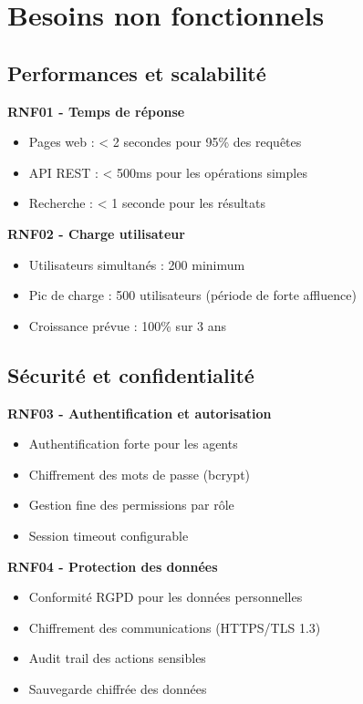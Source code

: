 \section{Besoins non fonctionnels}

\subsection{Performances et scalabilité}

\textbf{RNF01 - Temps de réponse}
\begin{itemize}
\item Pages web : < 2 secondes pour 95\% des requêtes
\item API REST : < 500ms pour les opérations simples
\item Recherche : < 1 seconde pour les résultats
\end{itemize}

\textbf{RNF02 - Charge utilisateur}
\begin{itemize}
\item Utilisateurs simultanés : 200 minimum
\item Pic de charge : 500 utilisateurs (période de forte affluence)
\item Croissance prévue : 100\% sur 3 ans
\end{itemize}

\subsection{Sécurité et confidentialité}

\textbf{RNF03 - Authentification et autorisation}
\begin{itemize}
\item Authentification forte pour les agents
\item Chiffrement des mots de passe (bcrypt)
\item Gestion fine des permissions par rôle
\item Session timeout configurable
\end{itemize}

\textbf{RNF04 - Protection des données}
\begin{itemize}
\item Conformité RGPD pour les données personnelles
\item Chiffrement des communications (HTTPS/TLS 1.3)
\item Audit trail des actions sensibles
\item Sauvegarde chiffrée des données
\end{itemize}

